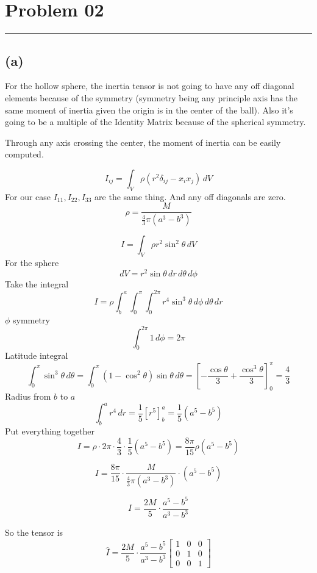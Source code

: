 \documentclass[letter, 10pts]{article}
\begin{document}
\newpage
\section*{Problem 02} 
\hrule 

\subsection*{(a)} 
For the hollow sphere, the inertia tensor is not going to have any off diagonal elements because of the symmetry (symmetry being any principle axis has the same moment of inertia given the origin is in the center of the ball). Also it's going to be a multiple of the Identity Matrix because of the spherical symmetry. 

Through any axis crossing the center, the moment of inertia can be easily computed. 

\[
I_{ij} = \int_V \rho \left( r^2 \delta_{ij} - x_i x_j \right) \, dV
\]
For our case $I_{11}, I_{22}, I_{33}$ are the same thing. And any off diagonals are zero. 
\[
\rho = \frac{M}{\frac{4}{3} \pi (a^3 - b^3)}
\]

\[
I = \int_V \rho r^2 \sin^2\theta \, dV
\]
For the sphere
\[
dV = r^2 \sin\theta \, dr \, d\theta \, d\phi
\]
Take the integral 
\[
I = \rho \int_b^a \int_0^\pi \int_0^{2\pi} r^4 \sin^3\theta \, d\phi \, d\theta \, dr
\]
$\phi$ symmetry
\[
\int_0^{2\pi} 1 \, d\phi = 2\pi
\]
Latitude integral 
\[
\int_0^\pi \sin^3\theta \, d\theta = \int_0^\pi (1 - \cos^2\theta) \sin\theta \, d\theta = \left[ -\frac{\cos\theta}{3} + \frac{\cos^3\theta}{3} \right]_0^\pi = \frac{4}{3}
\]
Radius from $b$ to $a$ 
\[
\int_b^a r^4 \, dr = \frac{1}{5} \left[ r^5 \right]_b^a = \frac{1}{5} (a^5 - b^5)
\]
Put everything together 
\[
I = \rho \cdot 2\pi \cdot \frac{4}{3} \cdot \frac{1}{5} (a^5 - b^5) = \frac{8\pi}{15} \rho (a^5 - b^5)
\]

\[
I = \frac{8\pi}{15} \cdot \frac{M}{\frac{4}{3} \pi (a^3 - b^3)} \cdot (a^5 - b^5)
\]

\[
I = \frac{2M}{5} \cdot \frac{a^5 - b^5}{a^3 - b^3}
\]

So the tensor is 
\[
\hat{I} = 
\frac{2M}{5} \cdot \frac{a^5 - b^5}{a^3 - b^3}
\begin{bmatrix} 1 & 0 & 0 \\ 0 & 1 & 0 \\ 0 & 0 & 1 \end{bmatrix} 
\] 
\end{document}
